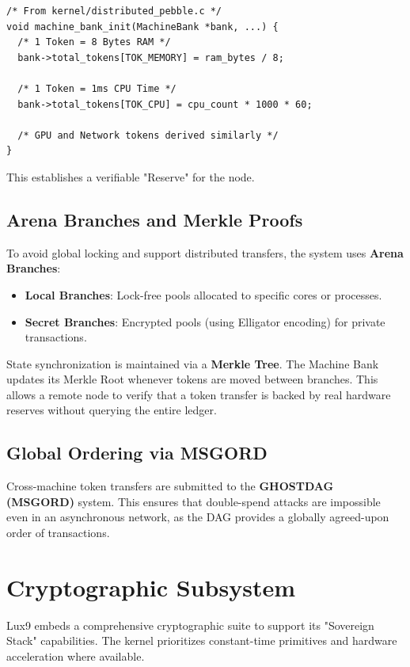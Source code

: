 \documentclass[11pt,letterpaper]{article}
\begin{document}
\begin{lstlisting}
/* From kernel/distributed_pebble.c */
void machine_bank_init(MachineBank *bank, ...) {
  /* 1 Token = 8 Bytes RAM */
  bank->total_tokens[TOK_MEMORY] = ram_bytes / 8;
  
  /* 1 Token = 1ms CPU Time */
  bank->total_tokens[TOK_CPU] = cpu_count * 1000 * 60;
  
  /* GPU and Network tokens derived similarly */
}
\end{lstlisting}

This establishes a verifiable "Reserve" for the node.

\subsection{Arena Branches and Merkle Proofs}

To avoid global locking and support distributed transfers, the system uses \textbf{Arena Branches}:

\begin{itemize}
\item \textbf{Local Branches}: Lock-free pools allocated to specific cores or processes.
\item \textbf{Secret Branches}: Encrypted pools (using Elligator encoding) for private transactions.
\end{itemize}

State synchronization is maintained via a \textbf{Merkle Tree}. The Machine Bank updates its Merkle Root whenever tokens are moved between branches. This allows a remote node to verify that a token transfer is backed by real hardware reserves without querying the entire ledger.

\subsection{Global Ordering via MSGORD}

Cross-machine token transfers are submitted to the \textbf{GHOSTDAG (MSGORD)} system. This ensures that double-spend attacks are impossible even in an asynchronous network, as the DAG provides a globally agreed-upon order of transactions.

\section{Cryptographic Subsystem}

Lux9 embeds a comprehensive cryptographic suite to support its "Sovereign Stack" capabilities. The kernel prioritizes constant-time primitives and hardware acceleration where available.
\end{document}
